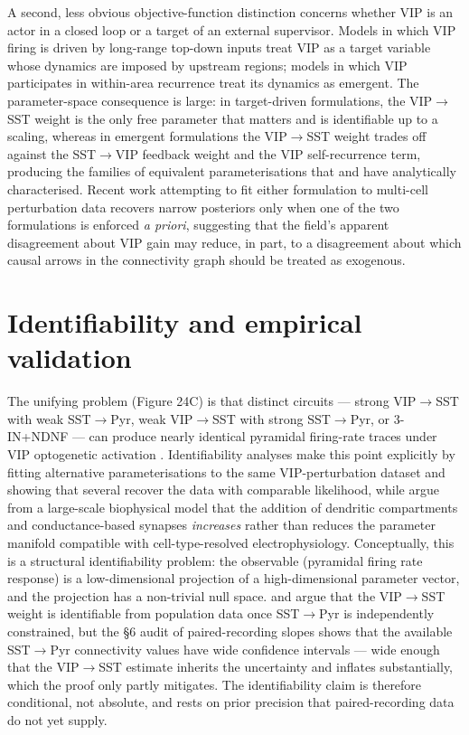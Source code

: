 \documentclass[11pt]{article}
\let\origrightarrow\rightarrow
\def\rightarrow{\ensuremath{\origrightarrow}}
\begin{document}
A second, less obvious objective-function distinction concerns whether VIP is an actor in a closed loop or a target of an external supervisor. Models in which VIP firing is driven by long-range top-down inputs \citep{Pi2013, Lee2013, Wilmes2019} treat VIP as a target variable whose dynamics are imposed by upstream regions; models in which VIP participates in within-area recurrence \citep{Garciadelmolino2017, Hertag2019, Hertag2020, Pedrosa2020, Rossbroich2025} treat its dynamics as emergent. The parameter-space consequence is large: in target-driven formulations, the VIP\rightarrow SST weight is the only free parameter that matters and is identifiable up to a scaling, whereas in emergent formulations the VIP\rightarrow SST weight trades off against the SST\rightarrow VIP feedback weight and the VIP self-recurrence term, producing the families of equivalent parameterisations that \citet{Litwinkumar2016} and \citet{Garciadelmolino2017} have analytically characterised. Recent work attempting to fit either formulation to multi-cell perturbation data \citep{Moreni2025a, Reimann2026} recovers narrow posteriors only when one of the two formulations is enforced \textit{a priori}, suggesting that the field's apparent disagreement about VIP gain may reduce, in part, to a disagreement about which causal arrows in the connectivity graph should be treated as exogenous.

\section{Identifiability and empirical validation}

The unifying problem (Figure 24C) is that distinct circuits --- strong VIP\rightarrow SST with weak SST\rightarrow Pyr, weak VIP\rightarrow SST with strong SST\rightarrow Pyr, or 3-IN+NDNF --- can produce nearly identical pyramidal firing-rate traces under VIP optogenetic activation \citep{Garciadelmolino2017, Reimann2026, Vighagen2021}.  Identifiability analyses \citep{Dellal2025} make this point explicitly by fitting alternative parameterisations to the same VIP-perturbation dataset and showing that several recover the data with comparable likelihood, while \citet{Reimann2026} argue from a large-scale biophysical model that the addition of dendritic compartments and conductance-based synapses \textit{increases} rather than reduces the parameter manifold compatible with cell-type-resolved electrophysiology. Conceptually, this is a structural identifiability problem: the observable (pyramidal firing rate response) is a low-dimensional projection of a high-dimensional parameter vector, and the projection has a non-trivial null space. \citet{Litwinkumar2016} and \citet{Moreni2025a} argue that the VIP\rightarrow SST weight is identifiable from population data once SST\rightarrow Pyr is independently constrained, but the §6 audit of paired-recording slopes shows that the available SST\rightarrow Pyr connectivity values have wide confidence intervals --- wide enough that the VIP\rightarrow SST estimate inherits the uncertainty and inflates substantially, which the \citep{Litwinkumar2016} proof only partly mitigates. The identifiability claim is therefore conditional, not absolute, and rests on prior precision that paired-recording data do not yet supply.
\end{document}
